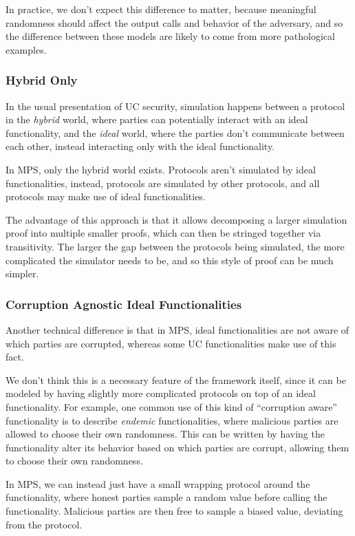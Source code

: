 In practice, we don't expect this difference to matter,
because meaningful randomness should affect the output
calls and behavior of the adversary,
and so the difference between these models are likely
to come from more pathological examples.

\subsubsection*{Hybrid Only}

In the usual presentation of UC security, simulation
happens between a protocol in the \emph{hybrid} world,
where parties can potentially interact with an ideal functionality,
and the \emph{ideal} world, where the parties
don't communicate between each other, instead interacting
only with the ideal functionality.

In MPS, only the hybrid world exists.
Protocols aren't simulated by ideal functionalities,
instead, protocols are simulated by other protocols,
and all protocols may make use of ideal functionalities.

The advantage of this approach is that it allows decomposing
a larger simulation proof into multiple smaller proofs,
which can then be stringed together via transitivity.
The larger the gap between the protocols being simulated,
the more complicated the simulator needs to be,
and so this style of proof can be much simpler.

\subsubsection*{Corruption Agnostic Ideal Functionalities}

Another technical difference is that in MPS,
ideal functionalities are not aware of which parties are corrupted,
whereas some UC functionalities make use of this fact.

We don't think this is a necessary feature of the framework itself,
since it can be modeled by having slightly more complicated
protocols on top of an ideal functionality.
For example, one common use of this kind of ``corruption aware''
functionality is to describe \emph{endemic} functionalities,
where malicious parties are allowed to choose their own randomness.
This can be written by having the functionality alter its behavior
based on which parties are corrupt, allowing them to choose their
own randomness.

In MPS, we can instead just have a small wrapping
protocol around the functionality, where honest parties
sample a random value before calling the functionality.
Malicious parties are then free to sample a biased value,
deviating from the protocol.

